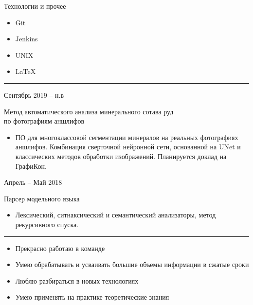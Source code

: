 \documentclass[a4paper,10pt]{article}
\newlength{\cvcolumngapwidth}
\newlength{\cvleftcolumnwidth}
\newlength{\cvrightcolumnwidth}
\newcommand{\cvsectionstyle}[1]{{\normalsize\cvsectionfont\textcolor{cvsectioncolor}{#1}}}
\newcommand{\cvtitlestyle}[1]{{\large\cvtitlefont\textcolor{cvtitlecolor}{#1}}}
\newcommand{\cvdurationstyle}[1]{{\small\cvdurationfont\textcolor{cvdurationcolor}{#1}}}
\newcommand{\cvheadingstyle}[1]{{\normalsize\cvheadingfont\textcolor{cvheadingcolor}{#1}}}
\newlength{\cvafteritemskipamount}
\newlength{\cvaftersectionskipamount}
\newlength{\cvbetweensectionandheadingextraskipamount}
\newlength{\cvaftertitleskipamount}
\newlength{\cvparskip}
\newcommand{\cvsection}[1]{
    \begin{minipage}[t]{\cvleftcolumnwidth}
        \raggedleft\cvsectionstyle{#1}
    \end{minipage}%
    \hspace{\cvcolumngapwidth}%
    \begin{minipage}[t]{\cvrightcolumnwidth}
        \textcolor{cvrulecolor}{\rule{\cvrightcolumnwidth}{0.3mm}}
    \end{minipage}

    \vspace{\cvaftersectionskipamount}
}
\newcommand{\cvitem}[2]{
    \begin{minipage}[t]{\cvleftcolumnwidth}
        \raggedleft #1
    \end{minipage}%
    \hspace{\cvcolumngapwidth}%
    \begin{minipage}[t]{\cvrightcolumnwidth}
        \setlength{\parskip}{\cvparskip} #2
    \end{minipage}

    \vspace{\cvafteritemskipamount}
}
\newcommand{\cvtitle}[1]{
    \cvtitlestyle{#1}

    \vspace{\cvaftertitleskipamount}
    \vspace{-\cvparskip}
}
\begin{document}
\cvitem{
    \cvheadingstyle{Технологии и прочее}
}{
    
    \begin{itemize}
        \item Git
        \item Jenkins
        \item UNIX
        \item \LaTeX
    \end{itemize}
}

\newpage
\cvsection{Проекты}

\vspace{\cvbetweensectionandheadingextraskipamount}

\cvitem{
    \cvdurationstyle{Сентябрь 2019 -- н.в}
}{
    \cvtitle{Метод автоматического анализа минерального сотава руд \\ по фотографиям аншлифов}

    \begin{itemize}[leftmargin=*]
        \item ПО для многоклассовой сегментации минералов на реальных фотографиях аншлифов. Комбинация сверточной нейронной сети, основанной на UNet и классических методов обработки изображений. Планируется доклад на ГрафиКон.
        
    \end{itemize}
}

\cvitem{
    \cvdurationstyle{Апрель -- Май 2018}
}{
    \cvtitle{Парсер модельного языка}
    \begin{itemize}[leftmargin=*]
        \item Лексический, ситнаксический и семантический анализаторы, метод рекурсивного спуска.
        
    \end{itemize}
}


\cvsection{Личные навыки}

\vspace{\cvbetweensectionandheadingextraskipamount}

\cvitem{
    \cvheadingstyle{}
}{
    
    \begin{itemize}
        \item Прекрасно работаю в команде
        \item Умею обрабатывать и усваивать большие объемы информации в сжатые сроки
        \item Люблю разбираться в новых технологиях
        \item Умею применять на практике теоретические знания
    \end{itemize}

    
}
\end{document}
